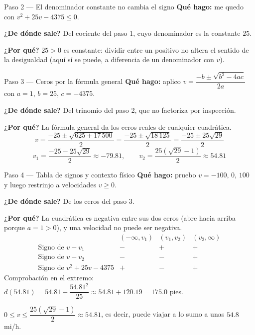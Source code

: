 \documentclass[11pt]{article}
\begin{document}
\begin{paso}{Paso 2 --- El denominador constante no cambia el signo}
\textbf{Qué hago:} me quedo con $v^2+25v-4375\le 0$.

\textbf{¿De dónde sale?} Del cociente del paso 1, cuyo denominador es la constante $25$.

\textbf{¿Por qué?} $25>0$ es constante: dividir entre un positivo no altera el sentido de la desigualdad (aquí sí se puede, a diferencia de un denominador con $v$).
\end{paso}

\begin{paso}{Paso 3 --- Ceros por la fórmula general}
\textbf{Qué hago:} aplico $v=\dfrac{-b\pm\sqrt{b^2-4ac}}{2a}$ con $a=1$, $b=25$, $c=-4375$.

\textbf{¿De dónde sale?} Del trinomio del paso 2, que no factoriza por inspección.

\textbf{¿Por qué?} La fórmula general da los ceros reales de cualquier cuadrática.
\[
v=\frac{-25\pm\sqrt{625+17\,500}}{2}=\frac{-25\pm\sqrt{18\,125}}{2}=\frac{-25\pm 25\sqrt{29}}{2}
\]
\[
v_1=\frac{-25-25\sqrt{29}}{2}\approx -79.81,\qquad
v_2=\frac{25(\sqrt{29}-1)}{2}\approx 54.81
\]
\end{paso}

\begin{paso}{Paso 4 --- Tabla de signos y contexto físico}
\textbf{Qué hago:} pruebo $v=-100,\,0,\,100$ y luego restrinjo a velocidades $v\ge 0$.

\textbf{¿De dónde sale?} De los ceros del paso 3.

\textbf{¿Por qué?} La cuadrática es negativa entre sus dos ceros (abre hacia arriba porque $a=1>0$), y una velocidad no puede ser negativa.
\[
\begin{array}{l|ccc}
 & (-\infty,v_1) & (v_1,v_2) & (v_2,\infty)\\\hline
\text{Signo de } v-v_1 & - & + & +\\
\text{Signo de } v-v_2 & - & - & +\\\hline
\text{Signo de } v^2+25v-4375 & + & - & +
\end{array}
\]
Comprobación en el extremo: $d(54.81)=54.81+\dfrac{54.81^2}{25}\approx 54.81+120.19=175.0$ pies.
\end{paso}

\begin{resp}
$0\le v\le \dfrac{25\left(\sqrt{29}-1\right)}{2}\approx 54.81$, es decir, puede viajar a lo sumo a unas $54.8$ mi/h.
\end{resp}
\end{document}
